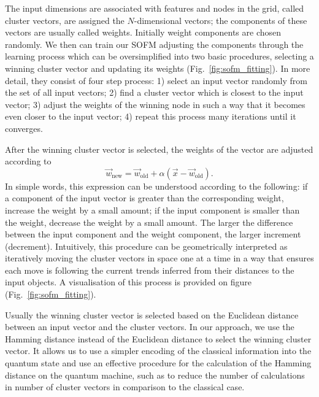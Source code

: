 \documentclass[pra,showkeys,twocolumn,showpacs]{revtex4-1}
\begin{document}
The input dimensions are associated with features and nodes in the grid, called cluster vectors, are assigned the $N$-dimensional vectors; 
the components of these vectors are usually called weights. 
Initially weight components are chosen randomly. 
We then can train our SOFM adjusting the components through the learning process which can be oversimplified into two basic procedures, 
selecting a winning cluster vector and updating its weights (Fig.~\ref{fig:sofm_fitting}). 
In more detail, they consist of four step process: 
1) select an input vector randomly from the set of all input vectors; 
2) find a cluster vector which is closest to the input vector; 
3) adjust the weights of the winning node in such a way that it becomes even closer to the input vector; 
4) repeat this process many iterations until it converges.


After the winning cluster vector is selected, the weights of the vector are adjusted according to 
%
\begin{equation}
    \label{eq:learning}
    \vec w_{\mathrm{new}} =
		\vec{w}_{\mathrm{old}} 
        + \alpha\left(\vec{x} - \vec w_{\mathrm{old}}\right)  .
\end{equation}
%
In simple words, this expression can be understood according to the following: 
if a component of the input vector is greater than the corresponding weight, increase the weight by a small amount; 
if the input component is smaller than the weight, decrease the
weight by a small amount. 
The larger the difference between the input component and the weight component, the larger increment (decrement). 
Intuitively, this procedure can be geometrically interpreted as iteratively moving the cluster vectors in space one at a time in a way 
that ensures each move is following the current trends inferred from their distances to the input objects. 
A visualisation of this process is provided on figure (Fig.~\ref{fig:sofm_fitting}).

Usually the winning cluster vector is selected based on the Euclidean distance between an input vector and the cluster vectors. 
In our approach, we use the Hamming distance instead of the Euclidean distance to select the winning cluster vector. 
It allows us to use a simpler encoding of the classical information into the quantum state and 
use an effective procedure for the calculation of the Hamming distance on the quantum machine, 
such as to reduce the number of calculations in number of cluster vectors in comparison to the classical case.
\end{document}
